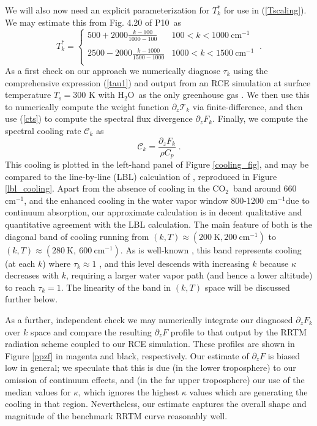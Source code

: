\documentclass[10pt]{article}
\newcommand{\beqn}{\begin{equation}}
\newcommand{\eeqn}{\end{equation}}
\newcommand{\eqnref}[1]{(\ref{#1})}
\newcommand{\n}{\nonumber}
\newcommand{\ppz}{\ensuremath{\partial_z}}
\newcommand{\cotwo}{\ensuremath{\mathrm{CO_2}}}
\newcommand{\htwo}{\ensuremath{\mathrm{H_2O}}}
\newcommand{\FLW}{\ensuremath{F}}
\newcommand{\trans}{\ensuremath{\mathcal{T}}}
\newcommand{\cool}{\ensuremath{\mathcal{C}}}
\newcommand{\cminverse}{\ensuremath{\mathrm{cm^{-1}}}}
\newcommand{\pierre}{P10}
\newcommand{\Ts}{\ensuremath{T_\mathrm{s}}}
\begin{document}
We will also now need an explicit parameterization for $T_k^*$ for use in \eqnref{Tscaling}. We may estimate this from Fig. 4.20 of \pierre\ as 
	\beqn
		T_k^* = \left\{ \begin{array}{lc}
							500 + 2000\frac{k-100}{1000-100} & 100 < k < 1000 \ \cminverse \\
								& \\
							2500 -2000\frac{k-1000}{1500-1000} & 1000 < k < 1500 \ \cminverse \\
						\end{array} \right.	\ .							
		\label{Tstar_param}
		\n
	\eeqn
As a first check on our approach we numerically diagnose $\tau_k$ using the comprehensive expression  \eqnref{tau1} and output from an RCE simulation at surface temperature $\Ts=300$ K with \htwo\ as the only greenhouse gas .  We then use this to numerically compute the weight function $\ppz\trans_k$ via finite-difference, and then use \eqnref{cts} to compute the spectral flux divergence $\ppz \FLW_k$. Finally, we  compute the spectral cooling rate $\cool_k$ as 
	\beqn
		\cool_k  = \frac{\ppz \FLW_k}{\rho C_p} \; .   \label{cooling_eqn}
	\eeqn
This cooling is plotted in the left-hand panel of Figure \ref{cooling_fig}, and  may be compared to the line-by-line (LBL) calculation of \cite{huang2013}, reproduced in Figure \ref{lbl_cooling}. Apart from the absence of cooling in the  \cotwo\ band around 660 \cminverse, and the enhanced cooling in the water vapor window 800-1200 \cminverse due to continuum absorption, our approximate calculation is in decent qualitative and quantitative agreement with the LBL calculation. The main feature of both is  the diagonal band of cooling running from 
$(k,T) \approx (200\ \mathrm{K} ,200\ \cminverse) $ to $(k,T) \approx (280\ \mathrm{K},\ 600\  \cminverse)$. As is well-known \citep[e.g.][]{goldblatt2013}, this band represents cooling (at each $k$) where  $\tau_k\approx 1$ \citep[e.g.,][]{wallace2006}, and this level descends with increasing $k$ because $\kappa$ decreases with $k$, requiring a larger water vapor path (and hence a lower altitude) to reach $\tau_k=1$. The linearity of the band in $(k,T)$ space will be discussed further below.

As a further, independent check we may numerically integrate our diagnosed $\ppz \FLW_k$ over $k$ space and compare the resulting $\ppz F$ profile to that output by the RRTM radiation scheme coupled to our RCE simulation. These profiles are shown in Figure
\ref{ppzf} in magenta and black, respectively. Our estimate of $\ppz \FLW$ is biased low in general; we speculate that this is due (in the lower troposphere) to our omission of continuum effects, and (in the far upper troposphere) our use of the median values for $\kappa$, which ignores the highest $\kappa$ values which are generating the cooling in that region. Nevertheless, our estimate captures the overall shape and magnitude of the benchmark RRTM curve reasonably well.
\end{document}
